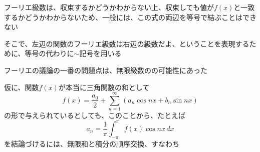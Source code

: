 \documentclass[../book_why-set-theory-why-topology]{subfiles}
\begin{document}
\br

フーリエ級数は、収束するかどうかわからない上、収束しても値が$f(x)$と一致するかどうかわからないため、一般には、この式の両辺を等号で結ぶことはできない

\br

そこで、左辺の関数のフーリエ級数は右辺の級数だよ、ということを表現するために、等号の代わりに$\sim$記号を用いる

\sectionline

フーリエの議論の一番の問題点は、無限級数のの可能性にあった

\br

仮に、関数$f(x)$が本当に三角関数の和として
\begin{equation*}
  f(x) = \dfrac{a_0}{2} + \sum_{n=1}^\infty \left( a_n \cos nx + b_n \sin nx \right)
\end{equation*}
の形で与えられているとしても、このことから、たとえば
\begin{equation*}
  a_n = \frac{1}{\pi} \int_{-\pi}^\pi f(x) \cos nx \, dx
\end{equation*}
を結論づけるには、無限和と積分の順序交換、すなわち
\end{document}
